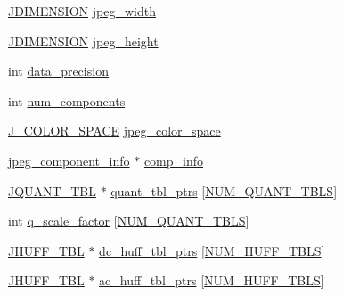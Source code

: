 \begin{DoxyCompactItemize}
\item 
\mbox{\hyperlink{jmorecfg_8h_a04ed4674f6f1d0d50ec241531e38274f}{J\+D\+I\+M\+E\+N\+S\+I\+ON}} \mbox{\hyperlink{structjpeg__compress__struct_ab433b317fcbe32212122621e476ac9d8}{jpeg\+\_\+width}}
\item 
\mbox{\hyperlink{jmorecfg_8h_a04ed4674f6f1d0d50ec241531e38274f}{J\+D\+I\+M\+E\+N\+S\+I\+ON}} \mbox{\hyperlink{structjpeg__compress__struct_abc2cf065c0faab28327f7238949f76d3}{jpeg\+\_\+height}}
\item 
int \mbox{\hyperlink{structjpeg__compress__struct_a64c5b59e436f7d3d1d38b58d49993469}{data\+\_\+precision}}
\item 
int \mbox{\hyperlink{structjpeg__compress__struct_a524f0284a6fcf96b21c8a745282c15e2}{num\+\_\+components}}
\item 
\mbox{\hyperlink{jpeglib_8h_a6ea40239360b06efe6377f125f1134f3}{J\+\_\+\+C\+O\+L\+O\+R\+\_\+\+S\+P\+A\+CE}} \mbox{\hyperlink{structjpeg__compress__struct_a7fb5305ec135340eddc2ebabec6a84d7}{jpeg\+\_\+color\+\_\+space}}
\item 
\mbox{\hyperlink{structjpeg__component__info}{jpeg\+\_\+component\+\_\+info}} $\ast$ \mbox{\hyperlink{structjpeg__compress__struct_a4d37d3f336cc11acafef541bf8ed38cc}{comp\+\_\+info}}
\item 
\mbox{\hyperlink{structJQUANT__TBL}{J\+Q\+U\+A\+N\+T\+\_\+\+T\+BL}} $\ast$ \mbox{\hyperlink{structjpeg__compress__struct_a70a194c6a9c1744e1ed3a97232fb97f5}{quant\+\_\+tbl\+\_\+ptrs}} \mbox{[}\mbox{\hyperlink{jpeglib_8h_ab3254a23612ea48615001fffc0c9f691}{N\+U\+M\+\_\+\+Q\+U\+A\+N\+T\+\_\+\+T\+B\+LS}}\mbox{]}
\item 
int \mbox{\hyperlink{structjpeg__compress__struct_a3d8545504353556fae60e1e865d2c600}{q\+\_\+scale\+\_\+factor}} \mbox{[}\mbox{\hyperlink{jpeglib_8h_ab3254a23612ea48615001fffc0c9f691}{N\+U\+M\+\_\+\+Q\+U\+A\+N\+T\+\_\+\+T\+B\+LS}}\mbox{]}
\item 
\mbox{\hyperlink{structJHUFF__TBL}{J\+H\+U\+F\+F\+\_\+\+T\+BL}} $\ast$ \mbox{\hyperlink{structjpeg__compress__struct_a6a69e90a68e1f7f46774d83ba3737a4e}{dc\+\_\+huff\+\_\+tbl\+\_\+ptrs}} \mbox{[}\mbox{\hyperlink{jpeglib_8h_a6b12985705944e0623b671f29dc5722e}{N\+U\+M\+\_\+\+H\+U\+F\+F\+\_\+\+T\+B\+LS}}\mbox{]}
\item 
\mbox{\hyperlink{structJHUFF__TBL}{J\+H\+U\+F\+F\+\_\+\+T\+BL}} $\ast$ \mbox{\hyperlink{structjpeg__compress__struct_a98d33cae3c8eee8f1f8d662e31cb905d}{ac\+\_\+huff\+\_\+tbl\+\_\+ptrs}} \mbox{[}\mbox{\hyperlink{jpeglib_8h_a6b12985705944e0623b671f29dc5722e}{N\+U\+M\+\_\+\+H\+U\+F\+F\+\_\+\+T\+B\+LS}}\mbox{]}

\end{DoxyCompactItemize}
